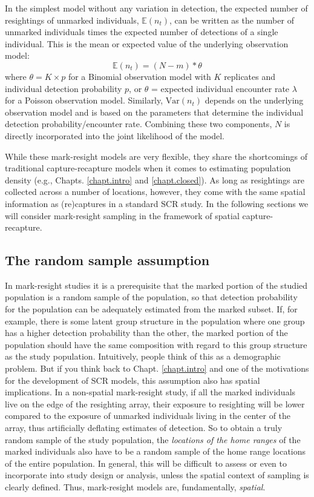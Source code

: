 In the simplest model without any variation in detection, the expected
number of resightings of unmarked individuals, $\mathbb{E}(n_t)$, can
be written as the number of unmarked individuals times the expected
number of detections of a single individual.  This is the mean or
expected value of the underlying observation model:
\begin{equation}
\mathbb{E}(n_t) = (N-m) * \theta
\end{equation}
\label{partialID.eq.E_n}
where $\theta = K \times p$ for a Binomial observation model with $K$
replicates and individual detection probability $p$, or $\theta$ =
expected individual encounter rate $\lambda$ for a Poisson
observation model. Similarly, $\mbox{Var}(n_t)$ depends on the
underlying observation model and is based on the parameters that
determine the individual detection probability/encounter
rate. Combining these two components, $N$ is directly incorporated
into the joint likelihood of the model.

While these mark-resight models are very flexible, they share the
shortcomings of traditional capture-recapture models when it comes to
estimating population density (e.g., Chapts. \ref{chapt.intro} and
\ref{chapt.closed}). As long as resightings are collected across a
number of locations, however, they come with the same spatial
information as (re)captures in a standard SCR study.  In the following
sections we will consider mark-resight sampling in the framework of
spatial capture-recapture.


\subsection {The random sample assumption}
\label{partialID.sec.random}

In mark-resight studies it is a prerequisite that the marked portion
of the studied population is a random sample of the population, so
that detection probability for the population can be adequately
estimated from the marked subset. If, for example, there is some
latent group structure in the population where one group has a higher
detection probability than the other, the marked portion of the
population should have the same composition with regard to this group
structure as the study population. Intuitively, people think of this
as a demographic problem. But if you think back to
Chapt. \ref{chapt.intro} and one of the motivations for the
development of SCR models, this assumption also has spatial
implications. In a non-spatial mark-resight study, if all the
marked individuals live on the edge of the resighting array, their
exposure to resighting will be lower compared to the exposure of
unmarked individuals living in the center of the array,
thus artificially deflating estimates of detection. So to obtain a
truly random sample of the study population, the \emph{locations of
  the home ranges} of the marked individuals also have to be a random
sample of the home range locations of the entire population.
In general, this will be difficult to assess or even to incorporate into
study design or analysis, unless the spatial context of sampling is
clearly defined.
Thus, mark-resight models are, fundamentally, {\it spatial}.


